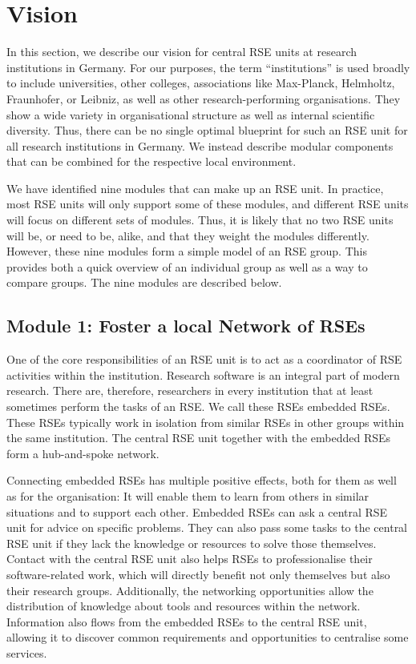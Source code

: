\documentclass[a4paper]{article}
\begin{document}
\section{Vision}%
\label{sec:vision}

In this section, we describe our vision for central RSE units at research institutions in Germany.
For our purposes, the term “institutions” is used broadly to include universities, other colleges, associations like Max-Planck, Helmholtz, Fraunhofer, or Leibniz, as well as other research-performing organisations.
They show a wide variety in organisational structure as well as internal scientific diversity.
Thus, there can be no single optimal blueprint for such an RSE unit for all research institutions in Germany.
We instead describe modular components that can be combined for the respective local environment.

We have identified nine modules that can make up an RSE unit.
In practice, most RSE units will only support some of these modules, and different RSE units will focus on different sets of modules.
Thus, it is likely that no two RSE units will be, or need to be, alike, and that they weight the modules differently. 
However, these nine modules form a simple model of an RSE group.
This provides both a quick overview of an individual group as well as a way to compare groups.
The nine modules are described below.

\subsection{Module 1: Foster a local Network of RSEs}%
\label{sec:network}

One of the core responsibilities of an RSE unit is to act as a coordinator of RSE activities within the institution.
Research software is an integral part of modern research.
There are, therefore, researchers in every institution that at least sometimes perform the tasks of an RSE\@.
We call these RSEs embedded RSEs.
These RSEs typically work in isolation from similar RSEs in other groups within the same institution.
The central RSE unit together with the embedded RSEs form a hub-and-spoke network.

Connecting embedded RSEs has multiple positive effects, both for them as well as for the organisation:
It will enable them to learn from others in similar situations and to support each other.
Embedded RSEs can ask a central RSE unit for advice on specific problems.
They can also pass some tasks to the central RSE unit if they lack the knowledge or resources to solve those themselves.
Contact with the central RSE unit also helps RSEs to professionalise their software-related work, which will directly benefit not only themselves but also their research groups.
Additionally, the networking opportunities allow the distribution of knowledge about tools and resources within the network.
Information also flows from the embedded RSEs to the central RSE unit, allowing it to discover common requirements and opportunities to centralise some services.
\end{document}

